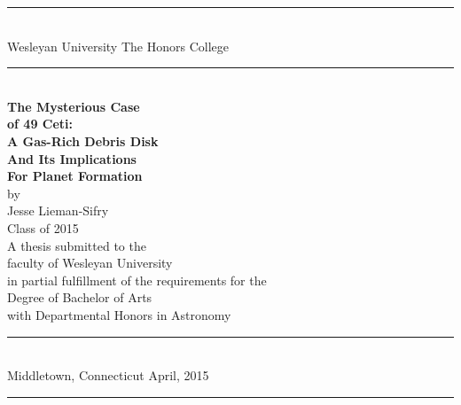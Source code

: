 \documentclass[12pt,oneside]{book}
\begin{document}
\frontmatter

\pagestyle{empty}
\begin{titlepage}
\begin{center}
\rule{5.75in}{1pt} \\
\vspace*{-0.125in}
{\large \doublespacing Wesleyan University} \hfill {\large \doublespacing The Honors College}
\rule[0.2in]{5.75in}{1pt} \\
\vspace*{0.8in}
{\LARGE \singlespacing \bf The Mysterious Case \\ of 49 Ceti: \\A Gas-Rich Debris Disk\\ And Its Implications\\For Planet Formation} \\
\vspace*{0.05in}
\vspace*{0.10in}
{\large \vspace*{0.20in}  \singlespacing by \vspace*{.2in}
\\Jesse Lieman-Sifry \\ Class of 2015\\}
\vspace*{0.25in}
\vspace*{0.8in}
{\large \singlespacing A thesis submitted to the\\ faculty of Wesleyan University\\ in partial fulfillment of the requirements for the \\ Degree of Bachelor of Arts\\ with Departmental Honors in Astronomy\\ \vspace*{-0.15in} }
\vspace*{.25in}
\rule{5.75in}{1pt} \\
\vspace*{-0.125in}
{\large \doublespacing Middletown, Connecticut \hfill April, 2015}
\rule[0.2in]{5.75in}{1pt} \\
\end{center}
\end{titlepage}


\end{document}
